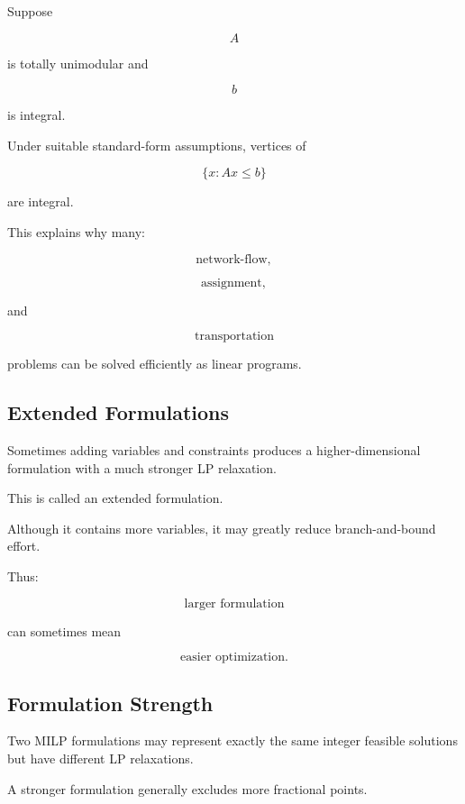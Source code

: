 Suppose

\[
A
\]

is totally unimodular and

\[
b
\]

is integral.

Under suitable standard-form assumptions, vertices of

\[
\boxed{
\{
x:
Ax\leq b
\}
}
\]

are integral.

This explains why many:

\[
\boxed{
\text{network-flow},
}
\]

\[
\boxed{
\text{assignment},
}
\]

and

\[
\boxed{
\text{transportation}
}
\]

problems can be solved efficiently as linear programs.

\subsection{Extended Formulations}
\label{subsec:integer-extended-formulations}

Sometimes adding variables and constraints produces a higher-dimensional
formulation with a much stronger LP relaxation.

This is called an extended formulation.

Although it contains more variables, it may greatly reduce
branch-and-bound effort.

Thus:

\[
\boxed{
\text{larger formulation}
}
\]

can sometimes mean

\[
\boxed{
\text{easier optimization}.
}
\]

\subsection{Formulation Strength}
\label{subsec:integer-formulation-strength}

Two MILP formulations may represent exactly the same integer feasible
solutions but have different LP relaxations.

A stronger formulation generally excludes more fractional points.

